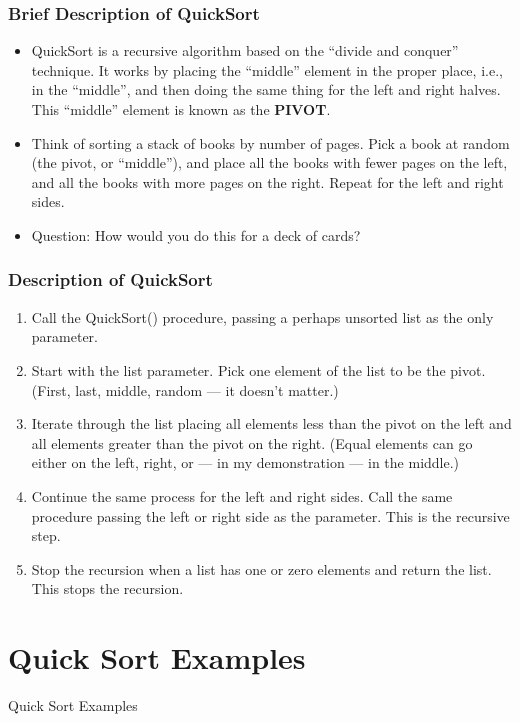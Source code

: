 \documentclass{beamer}
\begin{document}
    \begin{frame}
        \frametitle{Brief Description of QuickSort}
        \begin{itemize}
            \item QuickSort is a recursive algorithm based on the ``divide and conquer'' technique. It works by placing the ``middle'' element in the proper place, i.e., in the ``middle'', and then doing the same thing for the left and right halves. This ``middle'' element is known as the \textbf{PIVOT}.
            \item Think of sorting a stack of books by number of pages. Pick a book at random (the pivot, or ``middle''), and place all the books with fewer pages on the left, and all the books with more pages on the right. Repeat for the left and right sides.
            \item Question: How would you do this for a deck of cards?
        \end{itemize}
    \end{frame}

    \begin{frame}
        \frametitle{Description of QuickSort}
        \begin{enumerate}
            \item Call the QuickSort() procedure, passing a perhaps unsorted list as the only parameter.
            \item Start with the list parameter. Pick one element of the list to be the pivot. (First, last, middle, random --- it doesn't matter.)
            \item Iterate through the list placing all elements less than the pivot on the left and all elements greater than the pivot on the right. (Equal elements can go either on the left, right, or --- in my demonstration --- in the middle.)
            \item Continue the same process for the left and right sides. Call the same procedure passing the left or right side as the parameter. This is the recursive step.
            \item Stop the recursion when a list has one or zero elements and return the list. This stops the recursion.
        \end{enumerate}
    \end{frame}

\section{Quick Sort Examples}
\begin{frame}
    \LARGE Quick Sort Examples
\end{frame}
\end{document}
